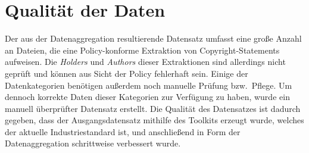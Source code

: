 
\section{Qualität der Daten}\label{sec:qualitaet-der-daten}

Der aus der Datenaggregation resultierende Datensatz umfasst eine große Anzahl an Dateien, die eine Policy-konforme Extraktion von Copyright-Statements aufweisen.
Die \textit{Holders} und \textit{Authors} dieser Extraktionen sind allerdings nicht geprüft und können aus Sicht der Policy fehlerhaft sein.
Einige der Datenkategorien benötigen außerdem noch manuelle Prüfung bzw.\ Pflege.
Um dennoch korrekte Daten dieser Kategorien zur Verfügung zu haben, wurde ein manuell überprüfter Datensatz erstellt.
Die Qualität des Datensatzes ist dadurch gegeben, dass der Ausgangsdatensatz mithilfe des Toolkits erzeugt wurde, welches der aktuelle Industriestandard ist, und anschließend in Form der Datenaggregation schrittweise verbessert wurde.
